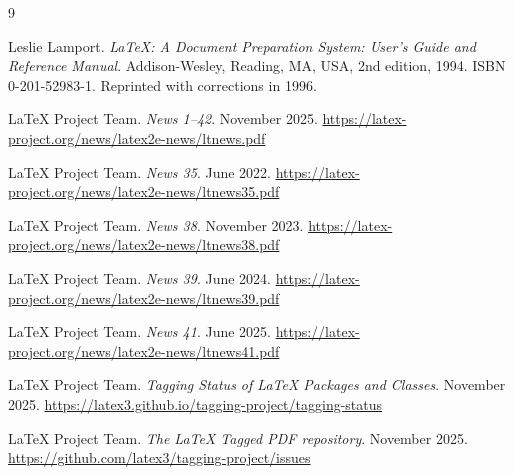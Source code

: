 \documentclass{ltnews}
\begin{document}
\begin{thebibliography}{9}\frenchspacing

\fontsize{9.3}{11.3}\selectfont

Leslie Lamport.
\newblock \emph{{\LaTeX}: {A} Document Preparation System: User's Guide and Reference
  Manual}.
\newblock \mbox{Addison}-Wesley, Reading, MA, USA, 2nd edition, 1994.
\newblock ISBN 0-201-52983-1.
\newblock Reprinted with corrections in 1996.

 \LaTeX{} Project Team.
  \emph{\LaTeXe{} News 1--42}. November 2025.
  \url{https://latex-project.org/news/latex2e-news/ltnews.pdf}

 \LaTeX{} Project Team.
  \emph{\LaTeXe{} News 35}. June 2022.
  \url{https://latex-project.org/news/latex2e-news/ltnews35.pdf}

 \LaTeX{} Project Team.
  \emph{\LaTeXe{} News 38}. November 2023.
  \url{https://latex-project.org/news/latex2e-news/ltnews38.pdf}

 \LaTeX{} Project Team.
  \emph{\LaTeXe{} News 39}. June 2024.
  \url{https://latex-project.org/news/latex2e-news/ltnews39.pdf}

 \LaTeX{} Project Team.
  \emph{\LaTeXe{} News 41}. June 2025.
  \url{https://latex-project.org/news/latex2e-news/ltnews41.pdf}

 \LaTeX{} Project Team.
  \emph{Tagging Status of \LaTeX{} Packages and Classes}. November 2025.
  \url{https://latex3.github.io/tagging-project/tagging-status}
  
 \LaTeX{} Project Team.
  \emph{The \LaTeX{} Tagged PDF repository}. November 2025.
  \url{https://github.com/latex3/tagging-project/issues}

\end{thebibliography}
\end{document}
